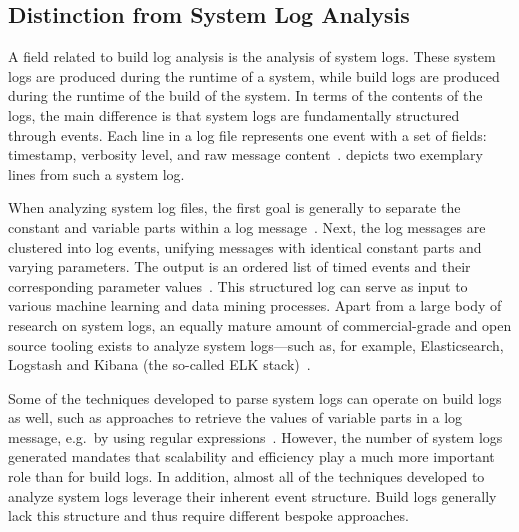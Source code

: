 \subsection{Distinction from System Log Analysis}
\label{sec:system-log-analysis}

A field related to build log analysis is the analysis of system logs.
These system logs are produced during the runtime of a system, while
build logs are produced during the runtime of the build of the system.
In terms of the contents of the logs, the main difference is that system
logs are fundamentally structured
through events.
Each line in a log file represents one event with a
set of fields: timestamp, verbosity level, and raw message
content~\cite{he2017towards}.
 depicts two
exemplary lines from such a system log.

When analyzing system log files, the first goal is generally to
separate the constant and variable parts within a log
message~\cite{nagappan2010abstracting,he2017towards}.
Next, the log
messages are clustered into log events, unifying messages with
identical constant parts and varying parameters.
The output is an
ordered list of timed events and their corresponding parameter
values~\cite{he2016evaluation}.
This structured log can serve as
input to various machine learning and data mining processes.
Apart
from a large body of research on system logs, an equally mature amount
of commercial-grade and
open source tooling exists to analyze system logs---such as, for
example, Elasticsearch, Logstash and Kibana (the so-called ELK
stack)~\cite{sanjappa2017analysis,bajer2017building}.

Some of the techniques developed to parse system logs can operate
on build logs as well, such as approaches to retrieve the
values of variable parts in a log message, e.g.\, by using regular
expressions~\cite{nagappan2010abstracting,xu2009detecting}.
However, the number of
system logs generated mandates that scalability and efficiency play a
much more important role than for build logs.
In addition, almost all of the techniques developed to analyze system logs
leverage their inherent event structure.
Build logs generally lack this
structure and thus require different bespoke approaches.


